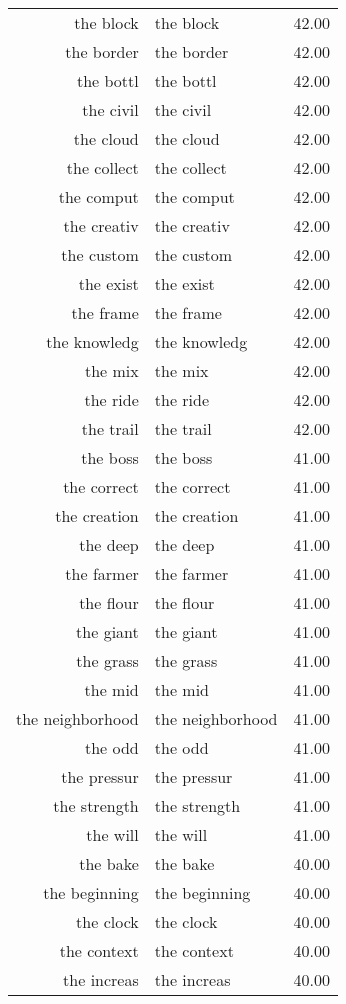 \begin{table}[ht]
\begin{tabular}{rlr}
  the block & the block & 42.00 \\ 
  the border & the border & 42.00 \\ 
  the bottl & the bottl & 42.00 \\ 
  the civil & the civil & 42.00 \\ 
  the cloud & the cloud & 42.00 \\ 
  the collect & the collect & 42.00 \\ 
  the comput & the comput & 42.00 \\ 
  the creativ & the creativ & 42.00 \\ 
  the custom & the custom & 42.00 \\ 
  the exist & the exist & 42.00 \\ 
  the frame & the frame & 42.00 \\ 
  the knowledg & the knowledg & 42.00 \\ 
  the mix & the mix & 42.00 \\ 
  the ride & the ride & 42.00 \\ 
  the trail & the trail & 42.00 \\ 
  the boss & the boss & 41.00 \\ 
  the correct & the correct & 41.00 \\ 
  the creation & the creation & 41.00 \\ 
  the deep & the deep & 41.00 \\ 
  the farmer & the farmer & 41.00 \\ 
  the flour & the flour & 41.00 \\ 
  the giant & the giant & 41.00 \\ 
  the grass & the grass & 41.00 \\ 
  the mid & the mid & 41.00 \\ 
  the neighborhood & the neighborhood & 41.00 \\ 
  the odd & the odd & 41.00 \\ 
  the pressur & the pressur & 41.00 \\ 
  the strength & the strength & 41.00 \\ 
  the will & the will & 41.00 \\ 
  the bake & the bake & 40.00 \\ 
  the beginning & the beginning & 40.00 \\ 
  the clock & the clock & 40.00 \\ 
  the context & the context & 40.00 \\ 
  the increas & the increas & 40.00 \\ 

\end{tabular}
\end{table}
